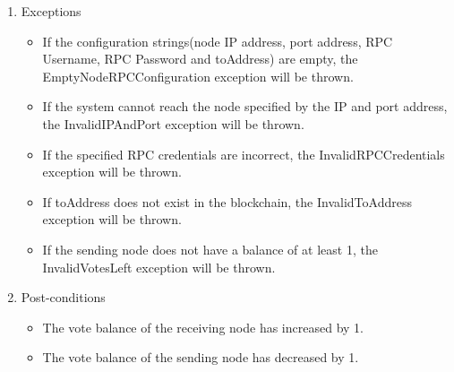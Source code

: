 \begin{enumerate}
\begin{enumerate}
\begin{enumerate}
					\item Exceptions
					\begin{itemize}
						\item If the configuration strings(node IP address, port address, RPC Username, RPC Password and toAddress) are empty, the EmptyNodeRPCConfiguration exception will be thrown.
						\item If the system cannot reach the node specified by the IP and port address, the InvalidIPAndPort exception will be thrown.
						\item If the specified RPC credentials are incorrect, the InvalidRPCCredentials exception will be thrown.
						\item If toAddress does not exist in the blockchain, the InvalidToAddress exception will be thrown.
						\item If the sending node does not have a balance of at least 1, the InvalidVotesLeft exception will be thrown.
					\end{itemize}
					
					\item Post-conditions
					\begin{itemize}
						\item The vote balance of the receiving node has increased by 1.
						\item The vote balance of the sending node has decreased by 1.
					\end{itemize}
				\end{enumerate}


\end{enumerate}
\end{enumerate}
